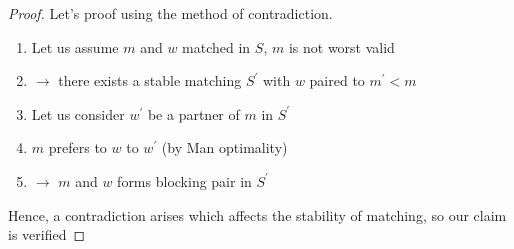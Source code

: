 \begin{proof}\label{thm_1_6}
Let's proof using the method of contradiction.
    \begin{enumerate}
    \item Let us assume $m$ and $w$ matched in $S$, $m$ is not worst valid
    \item $\longrightarrow$ there exists a stable matching $S^\prime$ with $w$ paired to $m^\prime < m$
    \item Let us consider $w^\prime$ be a partner of $m$ in $S^\prime$
    \item $m$ prefers to $w$ to $w^\prime$ (by Man optimality)
    \item $\longrightarrow$ $m$ and $w$ forms blocking pair in $S^\prime$
\end{enumerate}

Hence, a contradiction arises which affects the stability of matching, so our claim is verified
\end{proof}
